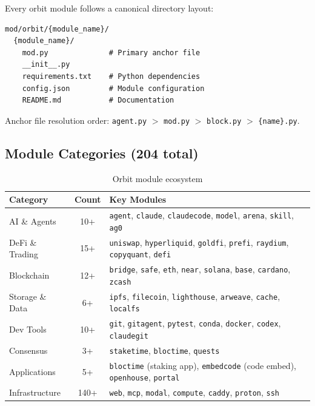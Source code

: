\documentclass[11pt,a4paper]{article}
\begin{document}
Every orbit module follows a canonical directory layout:

\begin{lstlisting}[basicstyle=\ttfamily\small, frame=single, backgroundcolor=\color{codebg}]
mod/orbit/{module_name}/
  {module_name}/
    mod.py              # Primary anchor file
    __init__.py
    requirements.txt    # Python dependencies
    config.json         # Module configuration
    README.md           # Documentation
\end{lstlisting}

Anchor file resolution order: \texttt{agent.py} $>$ \texttt{mod.py} $>$ \texttt{block.py} $>$ \texttt{\{name\}.py}.

\subsection{Module Categories (204 total)}

\begin{table}[H]
\centering
\begin{tabularx}{\textwidth}{lcX}
\toprule
\textbf{Category} & \textbf{Count} & \textbf{Key Modules} \\
\midrule
AI \& Agents & 10+ & \texttt{agent}, \texttt{claude}, \texttt{claudecode}, \texttt{model}, \texttt{arena}, \texttt{skill}, \texttt{ag0} \\
DeFi \& Trading & 15+ & \texttt{uniswap}, \texttt{hyperliquid}, \texttt{goldfi}, \texttt{prefi}, \texttt{raydium}, \texttt{copyquant}, \texttt{defi} \\
Blockchain & 12+ & \texttt{bridge}, \texttt{safe}, \texttt{eth}, \texttt{near}, \texttt{solana}, \texttt{base}, \texttt{cardano}, \texttt{zcash} \\
Storage \& Data & 6+ & \texttt{ipfs}, \texttt{filecoin}, \texttt{lighthouse}, \texttt{arweave}, \texttt{cache}, \texttt{localfs} \\
Dev Tools & 10+ & \texttt{git}, \texttt{gitagent}, \texttt{pytest}, \texttt{conda}, \texttt{docker}, \texttt{codex}, \texttt{claudegit} \\
Consensus & 3+ & \texttt{staketime}, \texttt{bloctime}, \texttt{quests} \\
Applications & 5+ & \texttt{bloctime} (staking app), \texttt{embedcode} (code embed), \texttt{openhouse}, \texttt{portal} \\
Infrastructure & 140+ & \texttt{web}, \texttt{mcp}, \texttt{modal}, \texttt{compute}, \texttt{caddy}, \texttt{proton}, \texttt{ssh} \\
\bottomrule
\end{tabularx}
\caption{Orbit module ecosystem}
\end{table}
\end{document}
